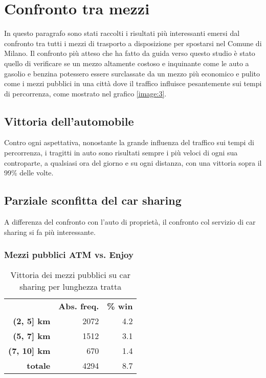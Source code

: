 \section{Confronto tra mezzi}

In questo paragrafo sono stati raccolti i risultati più interessanti emersi dal confronto tra tutti i mezzi di trasporto a disposizione per spostarsi nel Comune di Milano. Il confronto più atteso che ha fatto da guida verso questo studio è stato quello di verificare se un mezzo altamente costoso e inquinante come le auto a gasolio e benzina potessero essere surclassate da un mezzo più economico e pulito come i mezzi pubblici in una città dove il traffico influisce pesantemente sui tempi di percorrenza, come mostrato nel grafico \ref{image:3}.

\subsection{Vittoria dell'automobile}

Contro ogni aspettativa, nonostante la grande influenza del traffico sui tempi di percorrenza, i tragitti in auto sono risultati sempre i più veloci di ogni sua controparte, a qualsiasi ora del giorno e su ogni distanza, con una vittoria sopra il 99\% delle volte.

\subsection{Parziale sconfitta del car sharing}

A differenza del confronto con l'auto di proprietà, il confronto col servizio di car sharing si fa più interessante.

\subsubsection{Mezzi pubblici ATM vs. Enjoy}

\begin{table}[H]
\centering
\begin{tabular}{ | r r r | }
\hline
& \textbf{Abs. freq.} & \textbf{\% win} \\
\textbf{(2, 5] km} & 2072 & 4.2 \\
\textbf{(5, 7] km} & 1512 & 3.1 \\
\textbf{(7, 10] km} & 670 & 1.4 \\
\hline
\textbf{totale} & 4294 & 8.7 \\
\hline
\end{tabular}
\caption{Vittoria dei mezzi pubblici su car sharing per lunghezza tratta}
\label{table:5}
\end{table}

